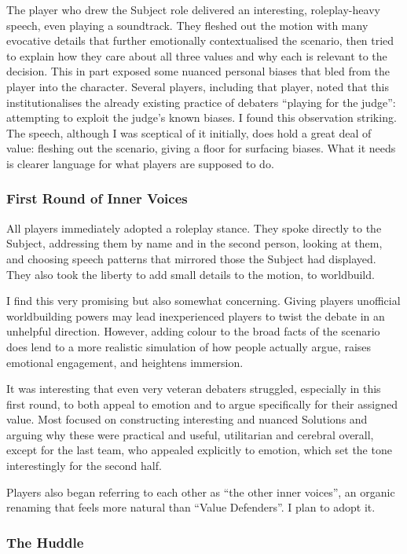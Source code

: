 The player who drew the Subject role delivered an interesting, roleplay-heavy speech, even playing a soundtrack. They fleshed out the motion with many evocative details that further emotionally contextualised the scenario, then tried to explain how they care about all three values and why each is relevant to the decision. This in part exposed some nuanced personal biases that bled from the player into the character. Several players, including that player, noted that this institutionalises the already existing practice of debaters ``playing for the judge'': attempting to exploit the judge's known biases. I found this observation striking. The speech, although I was sceptical of it initially, does hold a great deal of value: fleshing out the scenario, giving a floor for surfacing biases. What it needs is clearer language for what players are supposed to do.

\subsubsection{First Round of Inner Voices}

All players immediately adopted a roleplay stance. They spoke directly to the Subject, addressing them by name and in the second person, looking at them, and choosing speech patterns that mirrored those the Subject had displayed. They also took the liberty to add small details to the motion, to worldbuild.

I find this very promising but also somewhat concerning. Giving players unofficial worldbuilding powers may lead inexperienced players to twist the debate in an unhelpful direction. However, adding colour to the broad facts of the scenario does lend to a more realistic simulation of how people actually argue, raises emotional engagement, and heightens immersion.

It was interesting that even very veteran debaters struggled, especially in this first round, to both appeal to emotion and to argue specifically for their assigned value. Most focused on constructing interesting and nuanced Solutions and arguing why these were practical and useful, utilitarian and cerebral overall, except for the last team, who appealed explicitly to emotion, which set the tone interestingly for the second half.

Players also began referring to each other as ``the other inner voices'', an organic renaming that feels more natural than ``Value Defenders''. I plan to adopt it.

\subsubsection{The Huddle}

